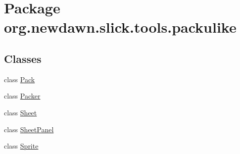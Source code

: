 \hypertarget{namespaceorg_1_1newdawn_1_1slick_1_1tools_1_1packulike}{}\section{Package org.\+newdawn.\+slick.\+tools.\+packulike}
\label{namespaceorg_1_1newdawn_1_1slick_1_1tools_1_1packulike}
\subsection*{Classes}
\begin{DoxyCompactItemize}
\item 
class \mbox{\hyperlink{classorg_1_1newdawn_1_1slick_1_1tools_1_1packulike_1_1_pack}{Pack}}
\item 
class \mbox{\hyperlink{classorg_1_1newdawn_1_1slick_1_1tools_1_1packulike_1_1_packer}{Packer}}
\item 
class \mbox{\hyperlink{classorg_1_1newdawn_1_1slick_1_1tools_1_1packulike_1_1_sheet}{Sheet}}
\item 
class \mbox{\hyperlink{classorg_1_1newdawn_1_1slick_1_1tools_1_1packulike_1_1_sheet_panel}{Sheet\+Panel}}
\item 
class \mbox{\hyperlink{classorg_1_1newdawn_1_1slick_1_1tools_1_1packulike_1_1_sprite}{Sprite}}
\end{DoxyCompactItemize}
